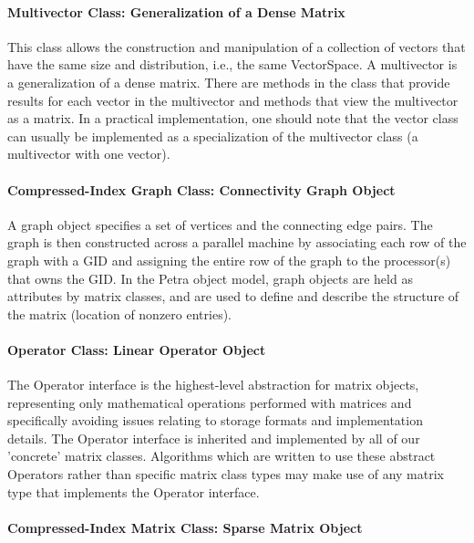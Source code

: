 \documentclass[12pt,relax]{PetraObjectModel}
\begin{document}
\paragraph{Multivector Class:  Generalization of a Dense Matrix}

This class allows the construction and manipulation of a collection of 
vectors that have the same size and distribution, i.e., the same VectorSpace.  
A multivector is a generalization of a dense matrix.  There are methods 
in the class that provide results for each vector in the multivector and 
methods that view the multivector as a matrix.  In a practical implementation, 
one should note that the vector class can usually be implemented as a 
specialization of the multivector class (a multivector with one vector).

\paragraph{Compressed-Index Graph Class:  Connectivity Graph Object}

A graph object specifies a set of vertices and the connecting edge pairs.
The graph is then constructed across a parallel machine by associating each
row of the graph with a GID and assigning the entire row of the graph to the
processor(s) that owns the GID. In the Petra object model, graph objects are
held as attributes by matrix classes, and are used to define and describe the
structure of the matrix (location of nonzero entries).

\paragraph{Operator Class: Linear Operator Object}

The Operator interface is the highest-level abstraction for matrix objects,
representing only mathematical operations performed with matrices and
specifically avoiding issues relating to storage formats and implementation
details. The Operator interface is inherited and implemented by all of our
'concrete' matrix classes.  Algorithms which are written to use these
abstract Operators rather than specific matrix class types may make use of
any matrix type that implements the Operator interface.

\paragraph{Compressed-Index Matrix Class: Sparse Matrix Object}
\end{document}
